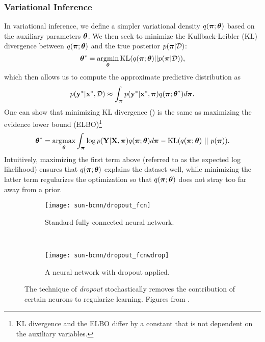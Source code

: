 \subsubsection{Variational Inference}
In variational inference, we define a simpler variational density $q(\boldsymbol{\mathbf{\pi}}; \boldsymbol{\mathbf{\theta}})$ based on the auxiliary parameters $\boldsymbol{\mathbf{\theta}}$. We then seek to minimize the Kullback-Leibler (KL) divergence between $q(\boldsymbol{\mathbf{\pi}}; \boldsymbol{\mathbf{\theta}})$ and the true posterior $p(\boldsymbol{\mathbf{\pi}} | \mathcal{D})$:
\begin{equation}
\label{eq:sun_bcnn_KL}
	\boldsymbol{\mathbf{\theta}}^* = \operatorname*{argmin}_{\boldsymbol{\mathbf{\theta}}}\text{KL}(q(\boldsymbol{\mathbf{\pi}}; \boldsymbol{\mathbf{\theta}}) || p(\boldsymbol{\mathbf{\pi}} | \mathcal{D})),
\end{equation}
which then allows us to compute the approximate predictive distribution as
\begin{equation}
	p(\boldsymbol{\mathbf{y}}^* | \boldsymbol{\mathbf{x}}^*, \mathcal{D}) \approx \int_{\boldsymbol{\mathbf{\pi}}}  p(\boldsymbol{\mathbf{y}}^* | \boldsymbol{\mathbf{x}}^*, \boldsymbol{\mathbf{\pi}}) q(\boldsymbol{\mathbf{\pi}}; \boldsymbol{\mathbf{\theta}}^*) d\boldsymbol{\mathbf{\pi}}.
\end{equation}
One can show that minimizing KL divergence () is the same as maximizing the evidence lower bound (ELBO)\footnote{KL divergence and the ELBO differ by a constant that is not dependent on the auxiliary variables.} 
\begin{equation}
\label{eq:sun_bcnn_ELBO}
	\boldsymbol{\mathbf{\theta}}^* = \operatorname*{argmax}_{\boldsymbol{\mathbf{\theta}}} \int_{\boldsymbol{\mathbf{\pi}}}  \log p(\boldsymbol{\mathbf{Y}} | \boldsymbol{\mathbf{X}}, \boldsymbol{\mathbf{\pi}})  q(\boldsymbol{\mathbf{\pi}}; \boldsymbol{\mathbf{\theta}}) d\boldsymbol{\mathbf{\pi}} -  \text{KL}(q(\boldsymbol{\mathbf{\pi}}; \boldsymbol{\mathbf{\theta}}) ~ || ~ p(\boldsymbol{\mathbf{\pi}})).
\end{equation}
Intuitively, maximizing the first term above (referred to as the expected log likelihood) ensures that $q(\boldsymbol{\mathbf{\pi}}; \boldsymbol{\mathbf{\theta}})$ explains the dataset well, while minimizing the latter term regularizes the optimization so that $q(\boldsymbol{\mathbf{\pi}}; \boldsymbol{\mathbf{\theta}})$ does not stray too far away from a prior.

\begin{figure}
\centering
\begin{subfigure}{0.45\textwidth}
	\centering
    \texttt{[image: sun-bcnn/dropout\_fcn]}
    \caption{Standard fully-connected neural network.}
\end{subfigure}
~
\begin{subfigure}{0.45\textwidth}
	\centering
    \texttt{[image: sun-bcnn/dropout\_fcnwdrop]}
    \caption{A neural network with dropout applied.}
\end{subfigure}
\caption{The technique of \textit{dropout} stochastically removes the contribution of certain neurons to regularize learning. Figures	 from \cite{srivastava_dropout_2014}.}
\label{fig:sun-bcnn_dropout}
\end{figure}



